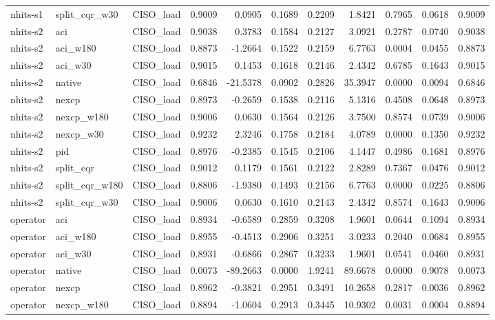 \begin{tabular}{lllrrrrrrrr}
nhits-s1 & split_cqr_w30 & CISO_load & 0.9009 & 0.0905 & 0.1689 & 0.2209 & 1.8421 & 0.7965 & 0.0618 & 0.9009 \\
nhits-s2 & aci & CISO_load & 0.9038 & 0.3783 & 0.1584 & 0.2127 & 3.0921 & 0.2787 & 0.0740 & 0.9038 \\
nhits-s2 & aci_w180 & CISO_load & 0.8873 & -1.2664 & 0.1522 & 0.2159 & 6.7763 & 0.0004 & 0.0455 & 0.8873 \\
nhits-s2 & aci_w30 & CISO_load & 0.9015 & 0.1453 & 0.1618 & 0.2146 & 2.4342 & 0.6785 & 0.1643 & 0.9015 \\
nhits-s2 & native & CISO_load & 0.6846 & -21.5378 & 0.0902 & 0.2826 & 35.3947 & 0.0000 & 0.0094 & 0.6846 \\
nhits-s2 & nexcp & CISO_load & 0.8973 & -0.2659 & 0.1538 & 0.2116 & 5.1316 & 0.4508 & 0.0648 & 0.8973 \\
nhits-s2 & nexcp_w180 & CISO_load & 0.9006 & 0.0630 & 0.1564 & 0.2126 & 3.7500 & 0.8574 & 0.0739 & 0.9006 \\
nhits-s2 & nexcp_w30 & CISO_load & 0.9232 & 2.3246 & 0.1758 & 0.2184 & 4.0789 & 0.0000 & 0.1350 & 0.9232 \\
nhits-s2 & pid & CISO_load & 0.8976 & -0.2385 & 0.1545 & 0.2106 & 4.1447 & 0.4986 & 0.1681 & 0.8976 \\
nhits-s2 & split_cqr & CISO_load & 0.9012 & 0.1179 & 0.1561 & 0.2122 & 2.8289 & 0.7367 & 0.0476 & 0.9012 \\
nhits-s2 & split_cqr_w180 & CISO_load & 0.8806 & -1.9380 & 0.1493 & 0.2156 & 6.7763 & 0.0000 & 0.0225 & 0.8806 \\
nhits-s2 & split_cqr_w30 & CISO_load & 0.9006 & 0.0630 & 0.1610 & 0.2143 & 2.4342 & 0.8574 & 0.1643 & 0.9006 \\
operator & aci & CISO_load & 0.8934 & -0.6589 & 0.2859 & 0.3208 & 1.9601 & 0.0644 & 0.1094 & 0.8934 \\
operator & aci_w180 & CISO_load & 0.8955 & -0.4513 & 0.2906 & 0.3251 & 3.0233 & 0.2040 & 0.0684 & 0.8955 \\
operator & aci_w30 & CISO_load & 0.8931 & -0.6866 & 0.2867 & 0.3233 & 1.9601 & 0.0541 & 0.0460 & 0.8931 \\
operator & native & CISO_load & 0.0073 & -89.2663 & 0.0000 & 1.9241 & 89.6678 & 0.0000 & 0.9078 & 0.0073 \\
operator & nexcp & CISO_load & 0.8962 & -0.3821 & 0.2951 & 0.3491 & 10.2658 & 0.2817 & 0.0036 & 0.8962 \\
operator & nexcp_w180 & CISO_load & 0.8894 & -1.0604 & 0.2913 & 0.3445 & 10.9302 & 0.0031 & 0.0004 & 0.8894 \\

\end{tabular}
